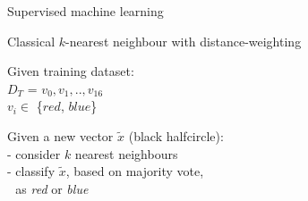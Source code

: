 \documentclass[10pt]{beamer}
\begin{document}
{\begin{frame}[fragile]{Supervised machine learning}

\end{frame}
}

{
\begin{frame}[fragile]{Classical $k$-nearest neighbour with distance-weighting}


\begin{minipage}[t]{.32\textwidth}
Given training dataset:\\
${D}_{T}$ = ${v}_{0}, {v}_{1},..,{v}_{16}$ \\
$v_{i} \in$ \{$red$, $blue$\}
\end{minipage}
\hspace{0.1cm}
\vline
\hspace{0.1cm}
\begin{minipage}[t]{.53\textwidth}
\flushleft
Given a new vector $\tilde{x}$ (black halfcircle):\\
- consider $k$ nearest neighbours\\
- classify $\tilde{x}$, based on majority vote,\\
$\> \> \>$as \emph{red} or \emph{blue}
\end{minipage}


\end{frame}}
\end{document}
